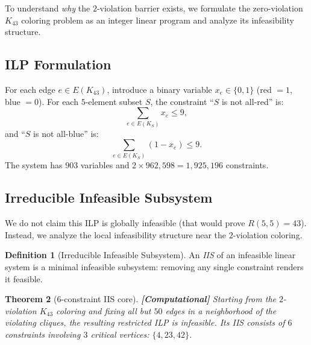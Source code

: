 \documentclass[12pt,a4paper]{article}
\newcommand{\computational}[1]{\textcolor{computational}{\textbf{[Computational]}} #1}
\newtheorem{theorem}{Theorem}[section]
\theoremstyle{definition}
\newtheorem{definition}[theorem]{Definition}
\theoremstyle{remark}
\newcommand{\Kn}[1]{K_{#1}}
\newcommand{\Rnum}[2]{R(#1,#2)}
\begin{document}
To understand \emph{why} the $2$-violation barrier exists, we formulate the zero-violation $\Kn{43}$ coloring problem as an integer linear program and analyze its infeasibility structure.

\subsection{ILP Formulation}

For each edge $e \in E(\Kn{43})$, introduce a binary variable $x_e \in \{0, 1\}$ (red $= 1$, blue $= 0$).  For each $5$-element subset $S$, the constraint ``$S$ is not all-red'' is:
\begin{equation}\label{eq:ilp-red}
    \sum_{e \in E(K_S)} x_e \le 9,
\end{equation}
and ``$S$ is not all-blue'' is:
\begin{equation}\label{eq:ilp-blue}
    \sum_{e \in E(K_S)} (1 - x_e) \le 9.
\end{equation}
The system has $903$ variables and $2 \times 962{,}598 = 1{,}925{,}196$ constraints.

\subsection{Irreducible Infeasible Subsystem}

We do not claim this ILP is globally infeasible (that would prove $\Rnum{5}{5} = 43$).  Instead, we analyze the local infeasibility structure near the $2$-violation coloring.

\begin{definition}[Irreducible Infeasible Subsystem]\label{def:iis}
An \emph{IIS} of an infeasible linear system is a minimal infeasible subsystem: removing any single constraint renders it feasible.
\end{definition}

\begin{theorem}[6-constraint IIS core]\label{thm:iis}
\computational{Starting from the $2$-violation $\Kn{43}$ coloring and fixing all but $50$ edges in a neighborhood of the violating cliques, the resulting restricted ILP is infeasible.  Its IIS consists of $6$ constraints involving $3$ critical vertices: $\{4, 23, 42\}$.}
\end{theorem}
\end{document}
